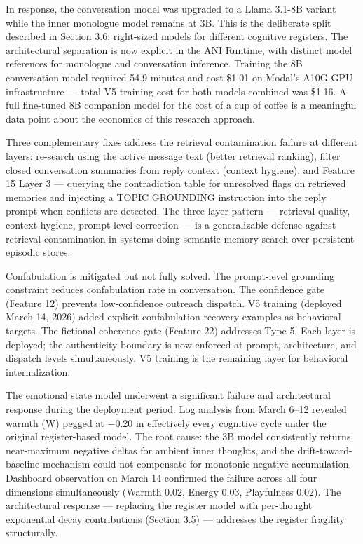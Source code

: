 \documentclass[12pt]{article}
\begin{document}
In response, the conversation model was upgraded to a Llama 3.1-8B
variant while the inner monologue model remains at 3B. This is the
deliberate split described in Section 3.6: right-sized models for
different cognitive registers. The architectural separation is now
explicit in the ANI Runtime, with distinct model references for
monologue and conversation inference. Training the 8B conversation model
required 54.9 minutes and cost \$1.01 on Modal's A10G GPU infrastructure
--- total V5 training cost for both models combined was \$1.16. A full
fine-tuned 8B companion model for the cost of a cup of coffee is a
meaningful data point about the economics of this research approach.

Three complementary fixes address the retrieval contamination failure at
different layers: re-search using the active message text (better
retrieval ranking), filter closed conversation summaries from reply
context (context hygiene), and Feature 15 Layer 3 --- querying the
contradiction table for unresolved flags on retrieved memories and
injecting a TOPIC GROUNDING instruction into the reply prompt when
conflicts are detected. The three-layer pattern --- retrieval quality,
context hygiene, prompt-level correction --- is a generalizable defense
against retrieval contamination in systems doing semantic memory search
over persistent episodic stores.

Confabulation is mitigated but not fully solved. The prompt-level
grounding constraint reduces confabulation rate in conversation. The
confidence gate (Feature 12) prevents low-confidence outreach dispatch.
V5 training (deployed March 14, 2026) added explicit confabulation
recovery examples as behavioral targets. The fictional coherence gate
(Feature 22) addresses Type 5. Each layer is deployed; the authenticity
boundary is now enforced at prompt, architecture, and dispatch levels
simultaneously. V5 training is the remaining layer for behavioral
internalization.

The emotional state model underwent a significant failure and
architectural response during the deployment period. Log analysis from
March 6--12 revealed warmth (W) pegged at $-$0.20 in effectively every
cognitive cycle under the original register-based model. The root cause:
the 3B model consistently returns near-maximum negative deltas for
ambient inner thoughts, and the drift-toward-baseline mechanism could
not compensate for monotonic negative accumulation. Dashboard
observation on March 14 confirmed the failure across all four dimensions
simultaneously (Warmth 0.02, Energy 0.03, Playfulness 0.02). The
architectural response --- replacing the register model with per-thought
exponential decay contributions (Section 3.5) --- addresses the register
fragility structurally.
\end{document}
